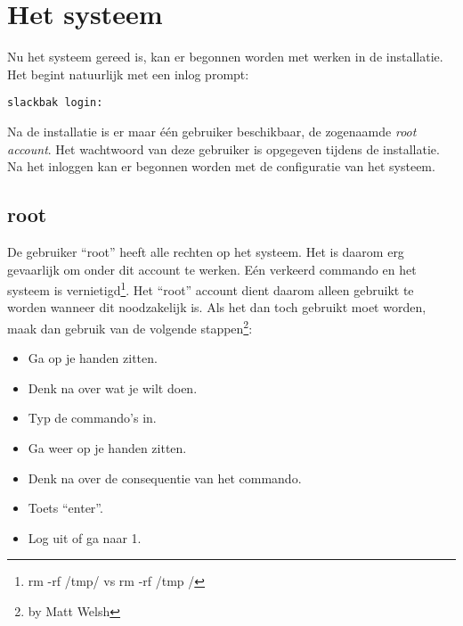 %
%
%
%

\chapter{Het systeem}
Nu het systeem gereed is, kan er begonnen worden met werken in de installatie. Het begint natuurlijk met een inlog prompt: 
\begin{lstlisting}
slackbak login: 
\end{lstlisting}
Na de installatie is er maar \'{e}\'{e}n gebruiker beschikbaar, de zogenaamde \emph{root account}. Het wachtwoord van deze gebruiker is opgegeven tijdens de installatie. Na het inloggen kan er begonnen worden met de configuratie van het systeem.

\section{root}
De gebruiker ``root'' heeft alle rechten op het systeem. Het is daarom erg gevaarlijk om onder dit account te werken. E\'{e}n verkeerd commando en het systeem is vernietigd\footnote{rm -rf /tmp/ vs rm -rf /tmp /}. Het ``root'' account dient daarom alleen gebruikt te worden wanneer dit noodzakelijk is. Als het dan toch gebruikt moet worden, maak dan gebruik van de volgende stappen\footnote{by Matt Welsh}:
\begin{itemize}
  \item[1.] Ga op je handen zitten.
  \item[2.] Denk na over wat je wilt doen.
  \item[3.] Typ de commando's in.
  \item[4.] Ga weer op je handen zitten.
  \item[5.] Denk na over de consequentie van het commando.
  \item[6.] Toets ``enter''.
  \item[7.] Log uit of ga naar 1.
\end{itemize}

